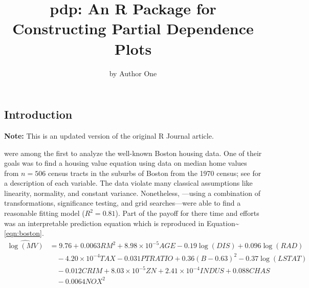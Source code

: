 \title{pdp: An R Package for Constructing Partial Dependence Plots}
\author{by Author One}

\maketitle


\hypertarget{introduction}{%
\subsection{Introduction}\label{introduction}}

\textbf{Note:} This is an updated version of the original R Journal
article.

\citet{harrison-1978-hedonic} were among the first to analyze the
well-known Boston housing data. One of their goals was to find a housing
value equation using data on median home values from \(n = 506\) census
tracts in the suburbs of Boston from the 1970 census; see
\citet[Table IV]{harrison-1978-hedonic} for a description of each
variable. The data violate many classical assumptions like linearity,
normality, and constant variance. Nonetheless,
\citeauthor{harrison-1978-hedonic}---using a combination of
transformations, significance testing, and grid searches---were able to
find a reasonable fitting model (\(R^2 = 0.81\)). Part of the payoff for
there time and efforts was an interpretable prediction equation which is
reproduced in Equation\textasciitilde{}\eqref{eqn:boston}.
\begin{equation}
\label{eqn:boston}
\begin{aligned}
\widehat{\log\left(MV\right)} &= 9.76 + 0.0063 RM^2 + 8.98\times10^{-5} AGE - 0.19\log\left(DIS\right) + 0.096\log\left(RAD\right) \\
  & \quad - 4.20\times10^{-4} TAX - 0.031 PTRATIO + 0.36\left(B - 0.63\right)^2 - 0.37\log\left(LSTAT\right) \\
  & \quad - 0.012 CRIM + 8.03\times10^{-5} ZN + 2.41\times10^{-4} INDUS + 0.088 CHAS \\
  & \quad - 0.0064 NOX^2
\end{aligned}
\end{equation}

